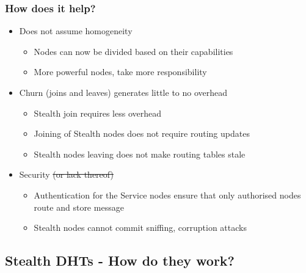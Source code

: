 \documentclass{beamer}
\begin{document}
\begin{frame}
  \frametitle{How does it help?}
    \begin{itemize}
    \item
        \alert{Does not} assume homogeneity\\
        \begin{itemize}
            \item Nodes can now be divided based on their capabilities
            \item More powerful nodes, take more responsibility
        \end{itemize}
    \item
        Churn (joins and leaves) generates \alert{little to no} overhead\\
        \begin{itemize}
            \item Stealth join requires less overhead
            \item Joining of Stealth nodes does not require routing
            updates
            \item Stealth nodes leaving does not make routing tables stale
        \end{itemize}
    \item
        Security \alert{\sout{(or lack thereof)}}\\
        \begin{itemize}
            \item Authentication for the Service nodes ensure that
            only authorised nodes route and store message
            \item Stealth nodes cannot commit sniffing, corruption
            attacks
        \end{itemize}
    \end{itemize}
\end{frame}

\subsection[Stealth DHTs - How do they work?]{Stealth DHTs - How do they work?}
\end{document}

